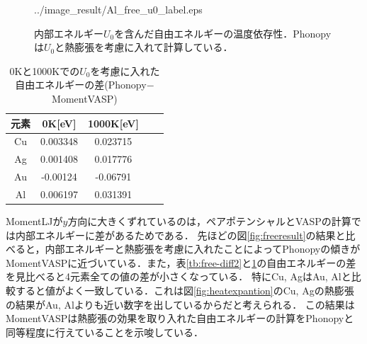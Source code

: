 \begin{figure}[htbp]
\begin{minipage}[b]{0.5\linewidth}
  {../image_result/Al_free_u0_label.eps}
  \label{free8}
 \end{minipage}
 \caption{内部エネルギー$U_0$を含んだ自由エネルギーの温度依存性．Phonopyは$U_0$と熱膨張を考慮に入れて計算している．}\label{fig:freeresult2}
\end{figure}

\begin{table}[htbp]
\caption{0Kと1000Kでの$U_0$を考慮に入れた自由エネルギーの差(Phonopy$-$MomentVASP)}
  \label{tb:free-diff3}
  \centering
  \begin{tabular}{ccccc}\hline
    元素 & 0K[eV] & 1000K[eV] \\ \hline \hline
    Cu & 0.003348 & 0.023715 \\
    Ag & 0.001408 & 0.017776 \\
    Au & -0.00124 & -0.06791 \\
    Al & 0.006197 & 0.031391 \\ \hline
  \end{tabular}
\end{table}
MomentLJが$y$方向に大きくずれているのは，ペアポテンシャルとVASPの計算では内部エネルギーに差があるためである．
先ほどの図\ref{fig:freeresult}の結果と比べると，内部エネルギーと熱膨張を考慮に入れたことによってPhonopyの傾きがMomentVASPに近づいている．また，表\ref{tb:free-diff2}と\ref{tb:free-diff3}の自由エネルギーの差を見比べると4元素全ての値の差が小さくなっている．
特にCu, AgはAu, Alと比較すると値がよく一致している．これは図\ref{fig:heatexpantion}のCu, Agの熱膨張の結果がAu, Alよりも近い数字を出しているからだと考えられる．
この結果はMomentVASPは熱膨張の効果を取り入れた自由エネルギーの計算をPhonopyと同等程度に行えていることを示唆している．

